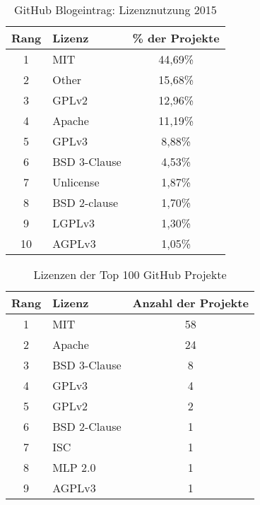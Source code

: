 \begin{table}[]
    \begin{tabular}{clc}
        \hline
        \multicolumn{1}{l}{Rang} & Lizenz      & \multicolumn{1}{l}{\% der Projekte} \\ \hline
        1                        & MIT          & 44,69\%                            \\
        2                        & Other        & 15,68\%                            \\
        3                        & GPLv2        & 12,96\%                            \\
        4                        & Apache       & 11,19\%                            \\
        5                        & GPLv3        & 8,88\%                             \\
        6                        & BSD 3-Clause & 4,53\%                             \\
        7                        & Unlicense    & 1,87\%                             \\
        8                        & BSD 2-clause & 1,70\%                             \\
        9                        & LGPLv3       & 1,30\%                             \\
        10                       & AGPLv3       & 1,05\%
    \end{tabular}%
    \caption{GitHub Blogeintrag: Lizenznutzung 2015}
    \label{tab:GitHub_Blog_Lizenznutzung2015}
\end{table}

\begin{table}[]
    \begin{tabular}{clc}
        \hline
        \multicolumn{1}{l}{Rang} & Lizenz       & \multicolumn{1}{l}{Anzahl der Projekte} \\ \hline
        1                        & MIT          & 58                                      \\
        2                        & Apache       & 24                                      \\
        3                        & BSD 3-Clause & 8                                       \\
        4                        & GPLv3        & 4                                       \\
        5                        & GPLv2        & 2                                       \\
        6                        & BSD 2-Clause & 1                                       \\
        7                        & ISC          & 1                                       \\
        8                        & MLP 2.0      & 1                                       \\
        9                        & AGPLv3       & 1
    \end{tabular}%
    \caption{Lizenzen der Top 100 GitHub Projekte}
    \label{tab:top_100}
\end{table}
